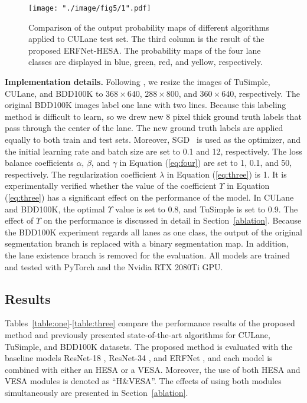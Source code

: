 \documentclass[10pt,twocolumn,letterpaper]{article}
\begin{document}
\begin{figure*}
	\setlength{\belowcaptionskip}{-10pt}
	\begin{center}
		\texttt{[image: "./image/fig5/1".pdf]}
		\\[-2ex]
		\caption{Comparison of the output probability maps of different algorithms applied to CULane test set. The third column is the result of the proposed ERFNet-HESA. The probability maps of the four lane classes are displayed in blue, green, red, and yellow, respectively.}
		\label{fig:culane}
	\end{center}
	\vspace{-2ex}
\end{figure*}

\noindent
\textbf{Implementation details.} Following \cite{pan2017spatial, hou2019learning}, we resize the images of TuSimple, CULane, and BDD100K to $368\times640$, $288\times800$, and $360\times640$, respectively. The original BDD100K images label one lane with two lines. Because this labeling method is difficult to learn, so we drew new 8 pixel thick ground truth labels that pass through the center of the lane. The new ground truth labels are applied equally to both train and test sets. Moreover, SGD~\cite{bottou2010large} is used as the optimizer, and the initial learning rate and batch size are set to 0.1 and 12, respectively. The loss balance coefficients $\alpha$, $\beta$, and $\gamma$ in Equation (\ref{eq:four}) are set to 1, 0.1, and 50, respectively. The regularization coefficient $\lambda$ in Equation (\ref{eq:three}) is 1. It is experimentally verified whether the value of the coefficient $\Upsilon$ in Equation (\ref{eq:three}) has a significant effect on the performance of the model. In CULane and BDD100K, the optimal $\Upsilon$ value is set to 0.8, and TuSimple is set to 0.9. The effect of $\Upsilon$ on the performance is discussed in detail in Section~\ref{ablation}. Because the BDD100K experiment regards all lanes as one class, the output of the original segmentation branch is replaced with a binary segmentation map. In addition, the lane existence branch is removed for the evaluation. All models are trained and tested with PyTorch and the Nvidia RTX 2080Ti GPU.

\subsection{Results}
\label{result}
Tables~\ref{table:one}-\ref{table:three} compare the performance results of the proposed method and previously presented state-of-the-art algorithms for CULane, TuSimple, and BDD100K datasets. The proposed method is evaluated with the baseline models ResNet-18 \cite{he2016deep}, ResNet-34 \cite{he2016deep}, and ERFNet \cite{romera2017erfnet}, and each model is combined with either an HESA or a VESA. Moreover, the use of both HESA and VESA modules is denoted as “H\&VESA”. The effects of using both modules simultaneously are presented in Section~\ref{ablation}.
\end{document}
